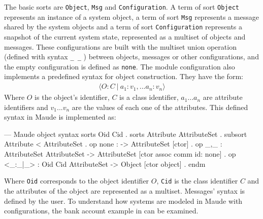 The basic sorts are \texttt{Object}, \texttt{Msg} and \texttt{Configuration}. A term of sort \texttt{Object} represents an instance of a system object, a term of sort \texttt{Msg} represents a message shared by the system objects and a term of sort \texttt{Configuration} represents a snapshot of the current system state, represented as a multiset of objects and messages. These configurations are built with the multiset union operation (defined with syntax \texttt{\_\,\_} ) between objects, messages or other configurations, and the empty configuration is defined as \texttt{none}. The module configuration also implements a predefined syntax for object construction. They have the form:
\begin{align*}
    \langle O : C \ | \ a_1:v_1,...a_n:v_n \rangle
\end{align*}
Where $O$ is the object's identifier, $C$ is a class identifier, $a_1...a_n$ are attribute identifiers and $v_1...v_n$ are the values of each one of the attributes. This defined syntax in Maude is implemented as:
\\
\begin{maude}
  --- Maude object syntax
  sorts Oid Cid .
  sorts Attribute AttributeSet .
  subsort Attribute < AttributeSet .
  op none : -> AttributeSet [ctor] .
  op _,_ : AttributeSet AttributeSet -> AttributeSet
  [ctor assoc comm id: none] .
  op <_:_|_> : Oid Cid AttributeSet -> Object [ctor object] .
endm
\end{maude}
Where \texttt{Oid} corresponds to the object identifier $O$, \texttt{Cid} is the class identifier $C$ and the attributes of the object are represented as a multiset. Messages' syntax is defined by the user. To understand how systems are modeled in Maude with configurations, the bank account example in \cite{MaudeManual} can be examined.
